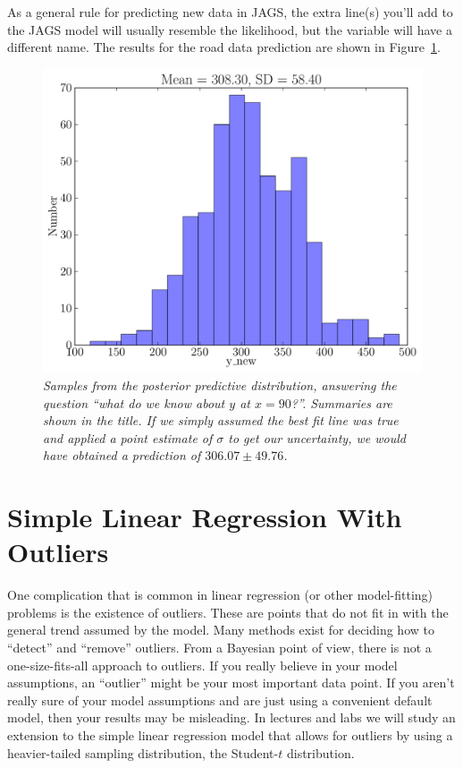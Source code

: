 As a general rule for predicting new data in JAGS, the extra line(s) you'll add to the JAGS
model will usually resemble the likelihood, but the variable will have a different name.
The results for the road data prediction are shown
in Figure~\ref{fig:road_prediction}.
\begin{figure}[!ht]
\begin{center}
\includegraphics[scale=0.5]{Figures/road_prediction.pdf}
\caption{\it Samples from the posterior predictive distribution, answering the
question ``what do we know about $y$ at $x=90$?''. Summaries are shown in
the title. If we simply assumed the best fit line was true and applied a
point estimate of $\sigma$ to get our uncertainty, we would have obtained a
prediction of $306.07 \pm 49.76$.\label{fig:road_prediction}}
\end{center}
\end{figure}

\section{Simple Linear Regression With Outliers}
One complication that is common in linear regression (or other model-fitting)
problems is the existence of outliers. These are points that do not fit in with
the general trend assumed by the model. Many methods exist for deciding how to
``detect'' and ``remove''
outliers. From a Bayesian point of view, there is not a one-size-fits-all approach
to outliers. If you really believe in your model assumptions, an ``outlier''
might be your most important data point. If you aren't really sure of your
model assumptions and are just using a convenient default model, then your results
may be misleading.
In lectures and labs we will study an extension to the simple linear
regression model that allows for outliers by using a heavier-tailed sampling
distribution, the Student-$t$ distribution.

